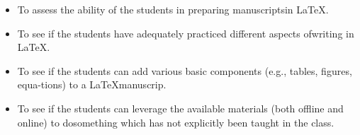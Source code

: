 \documentclass[18pt,a4paper]{article}
\begin{document}
\begin{itemize}
\item {\huge To assess the ability of 
the students in preparing manuscriptsin \LaTeX .}
\item {\large To see if the students have 
adequately practiced different aspects ofwriting in \LaTeX.}
\item { \small To see if the students can add various basic components 
(e.g., tables, figures, equa-tions) to a \LaTeX manuscrip.}
\item {\tiny To see if the students can leverage the available materials
 (both offline and online) to dosomething which has not explicitly been taught
  in the class.}
\end{itemize}
\end{document}
